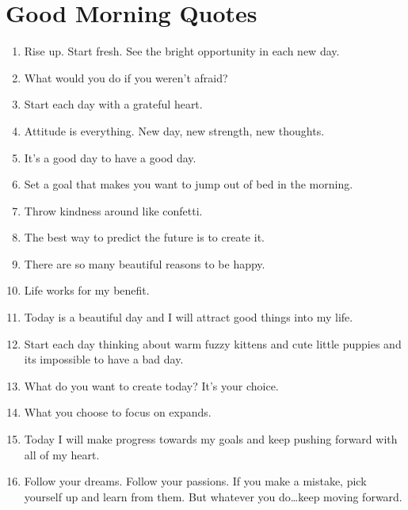     \section*{Good Morning Quotes}
        \begin{enumerate}
            \item Rise up. Start fresh. See the bright opportunity in each new day.

            \item What would you do if you weren’t afraid?

            \item Start each day with a grateful heart.

            \item Attitude is everything. New day, new strength, new thoughts.

            \item It’s a good day to have a good day.

            \item Set a goal that makes you want to jump out of bed in the morning.

            \item Throw kindness around like confetti.

            \item The best way to predict the future is to create it.

            \item There are so many beautiful reasons to be happy.

            \item Life works for my benefit.

            \item Today is a beautiful day and I will attract good things into my life.

            \item Start each day thinking about warm fuzzy kittens and cute little puppies and its impossible to have a bad day.

            \item What do you want to create today? It’s your choice.

            \item What you choose to focus on expands.

            \item Today I will make progress towards my goals and keep pushing forward with all of my heart.

            \item Follow your dreams. Follow your passions. If you make a mistake, pick yourself up and learn from them. But whatever you do…keep moving forward.


\end{enumerate}
